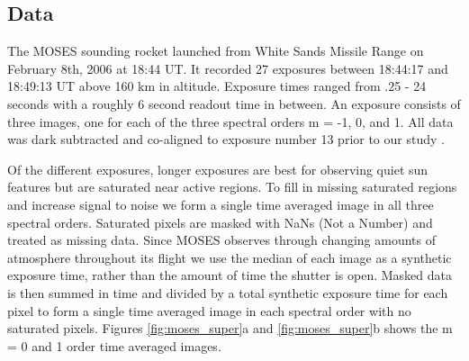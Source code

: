 \documentclass[]{solarphysics}
\begin{document}
\begin{article}
\section{Data}	
	
	The \ac{MOSES} sounding rocket launched from White Sands Missile Range on February 8th, 2006 at 18:44 UT. It recorded 27 exposures between 18:44:17 and 18:49:13 UT above 160 km in altitude.  Exposure times ranged from .25 - 24 seconds with a roughly 6 second readout time in between.  An exposure consists of three images, one for each of the three spectral orders m = -1, 0, and 1.  All data was dark subtracted and co-aligned to exposure number 13 prior to our study \citep{Fox2010,Fox2011,Rust2017}. 
	
	Of the different exposures, longer exposures are best for observing quiet sun features but are saturated near active regions.  To fill in missing saturated regions and increase signal to noise we form a single time averaged image in all three spectral orders. Saturated pixels are masked with NaNs (Not a Number) and treated as missing data. Since \ac{MOSES} observes through changing amounts of atmosphere throughout its flight we use the median of each image as a synthetic exposure time, rather than the amount of time the shutter is open. Masked data is then summed in time and divided by a total synthetic exposure time for each pixel to form a single time averaged image in each spectral order with no saturated pixels.  Figures \ref{fig:moses_super}a and \ref{fig:moses_super}b shows the m = 0 and 1 order time averaged images. 
	


	\begin{figure}
		
		
				
		
		
		
		
		
			
\end{figure}
\end{article}
\end{document}
